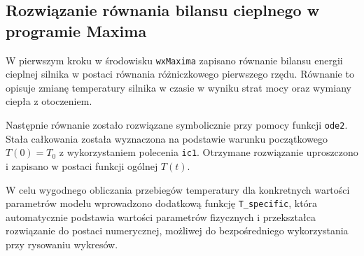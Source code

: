 \documentclass[a4paper,12pt]{article}
\begin{document}
	
	
	
	
	
	\subsection{Rozwiązanie równania bilansu cieplnego w programie Maxima}
	
	W pierwszym kroku w środowisku \texttt{wxMaxima} zapisano równanie bilansu energii
	cieplnej silnika w postaci równania różniczkowego pierwszego rzędu.
	Równanie to opisuje zmianę temperatury silnika w czasie w wyniku strat mocy
	oraz wymiany ciepła z otoczeniem.
	
	Następnie równanie zostało rozwiązane symbolicznie przy pomocy funkcji
	\texttt{ode2}. Stała całkowania została wyznaczona na podstawie warunku
	początkowego $T(0)=T_0$ z wykorzystaniem polecenia \texttt{ic1}.
	Otrzymane rozwiązanie uproszczono i zapisano w postaci funkcji ogólnej
	$T(t)$.
	
	W celu wygodnego obliczania przebiegów temperatury dla konkretnych wartości
	parametrów modelu wprowadzono dodatkową funkcję \texttt{T\_specific},
	która automatycznie podstawia wartości parametrów fizycznych
	i przekształca rozwiązanie do postaci numerycznej, możliwej do bezpośredniego
	wykorzystania przy rysowaniu wykresów.
	
\end{document}
